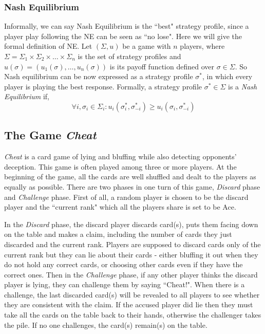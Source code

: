 \documentclass[runningheads]{llncs}
\begin{document}
    \subsubsection{Nash Equilibrium}
    \label{NE}

    Informally, we can say Nash Equilibrium is the ``best" strategy profile, since a player play following the NE can be seen as ``no lose". Here we will give the formal definition of NE. Let $(\Sigma,u)$ be a game with $n$ players, where $\Sigma = \Sigma_1 \times \Sigma_2 \times \dots \times \Sigma_n$ is the set of strategy profiles and $u(\sigma) = (u_1(\sigma), \dots, u_n(\sigma))$ is its payoff function defined over $\sigma \in \Sigma$. So Nash equilibrium can be now expressed as a strategy profile $\sigma^*$, in which every player is playing the best response. Formally, a strategy profile $\sigma^* \in \Sigma$ is a \textit{Nash Equilibrium} if,
    \begin{equation}
    \forall i, \sigma_i \in \Sigma_i : u_i(\sigma^*_i, \sigma^{*}_{-i}) \geq u_i(\sigma_i, \sigma^{*}_{-i})
    \end{equation}
    
    \subsection{The Game \textit{Cheat}}
    \label{Cheat}
    
    \textit{Cheat} is a card game of lying and bluffing while also detecting opponents' deception. This game is often played among three or more players. At the beginning of the game, all the cards are well shuffled and dealt to the players as equally as possible. There are two phases in one turn of this game, \textit{Discard} phase and \textit{Challenge} phase. First of all, a random player is chosen to be the discard player and the ``current rank" which all the players share is set to be Ace.
    
    In the \textit{Discard} phase, the discard player discards card(s), puts them facing down on the table and makes a claim, including the number of cards they just discarded and the current rank. Players are supposed to discard cards only of the current rank but they can lie about their cards - either bluffing it out when they do not hold any correct cards, or choosing other cards even if they have the correct ones. Then in the \textit{Challenge} phase, if any other player thinks the discard player is lying, they can challenge them by saying ``Cheat!". When there is a challenge, the last discarded card(s) will be revealed to all players to see whether they are consistent with the claim. If the accused player did lie then they must take all the cards on the table back to their hands, otherwise the challenger takes the pile. If no one challenges, the card(s) remain(s) on the table. 
    
\end{document}
